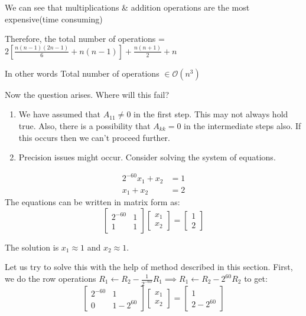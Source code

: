 \documentclass[
]{book}
\begin{document}
We can see that multiplications \& addition operations are the most expensive(time consuming)

Therefore, the total number of operations = \(2\left[ \frac{n(n-1)(2n-1)}{6}+n(n-1)\right]+\frac{n(n+1)}{2}+n\)

In other words Total number of operations \(\in \mathcal{O}(n^3)\)

Now the question arises. Where will this fail?

\begin{enumerate}
\def\labelenumi{\arabic{enumi}.}
\item
  We have assumed that \(A_{11} \neq 0\) in the first step. This may not always hold true. Also, there is a possibility that \(A_{kk}=0\) in the intermediate steps also. If this occurs then we can't proceed further.
\item
  Precision issues might occur. Consider solving the system of equations.
\end{enumerate}

\begin{align}
2^{-60}x_1+x_2&=1\\
x_1+x_2&=2
\end{align}
The equations can be written in matrix form as:
\begin{equation}
\begin{bmatrix}
2^{-60}& 1\\
1& 1
\end{bmatrix}
\begin{bmatrix}
x_1\\x_2
\end{bmatrix}
= 
\begin{bmatrix}
1\\2
\end{bmatrix}
\end{equation}

The solution is \(x_1 \approx 1\) and \(x_2 \approx 1\).

Let us try to solve this with the help of method described in this section.
First, we do the row operations \(R_1 \gets R_2 - \frac{1}{2^{-60}}R_1 \implies R_1 \gets R_2 - 2^{60} R_2\) to get:
\begin{equation}
\begin{bmatrix}
2^{-60}& 1\\
0& 1-2^{60}
\end{bmatrix}
\begin{bmatrix}
x_1\\x_2
\end{bmatrix}
= 
\begin{bmatrix}
1\\2-2^{60}
\end{bmatrix}
\end{equation}
\end{document}
